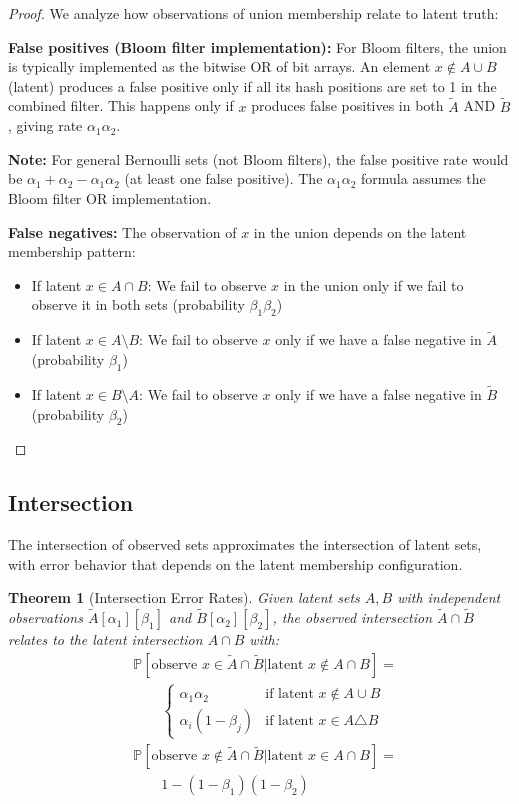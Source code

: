 \documentclass[11pt,final,hidelinks]{article}
\newtheorem{theorem}{Theorem}[section]
\newcommand{\obs}[1]{\widetilde{#1}}  %
\newcommand{\SetIntersection}{\cap}
\newcommand{\Prob}[1]{\mathbb{P}\left[#1\right]}
\newcommand{\fprate}{\alpha}
\newcommand{\fnrate}{\beta}
\begin{document}
\begin{proof}
We analyze how observations of union membership relate to latent truth:

\textbf{False positives (Bloom filter implementation):} For Bloom filters, the union is typically implemented as the bitwise OR of bit arrays. An element $x \notin A \cup B$ (latent) produces a false positive only if all its hash positions are set to 1 in the combined filter. This happens only if $x$ produces false positives in both $\obs{A}$ AND $\obs{B}$, giving rate $\fprate_1 \fprate_2$.

\textbf{Note:} For general Bernoulli sets (not Bloom filters), the false positive rate would be $\fprate_1 + \fprate_2 - \fprate_1\fprate_2$ (at least one false positive). The $\fprate_1 \fprate_2$ formula assumes the Bloom filter OR implementation.

\textbf{False negatives:} The observation of $x$ in the union depends on the latent membership pattern:
\begin{itemize}
    \item If latent $x \in A \cap B$: We fail to observe $x$ in the union only if we fail to observe it in both sets (probability $\fnrate_1 \fnrate_2$)
    \item If latent $x \in A \setminus B$: We fail to observe $x$ only if we have a false negative in $\obs{A}$ (probability $\fnrate_1$)
    \item If latent $x \in B \setminus A$: We fail to observe $x$ only if we have a false negative in $\obs{B}$ (probability $\fnrate_2$)
\end{itemize}
\end{proof}

\subsection{Intersection}

The intersection of observed sets approximates the intersection of latent sets, with error behavior that depends on the latent membership configuration.

\begin{theorem}[Intersection Error Rates]
Given latent sets $A, B$ with independent observations $\obs{A}[\fprate_1][\fnrate_1]$ and $\obs{B}[\fprate_2][\fnrate_2]$, the observed intersection $\obs{A} \SetIntersection \obs{B}$ relates to the latent intersection $A \SetIntersection B$ with:
\begin{align}
&\Prob{\text{observe } x \in \obs{A} \SetIntersection \obs{B} | \text{latent } x \notin A \SetIntersection B} = \\
&\qquad\begin{cases}
\fprate_1 \fprate_2 & \text{if latent } x \notin A \cup B \\
\fprate_i(1-\fnrate_j) & \text{if latent } x \in A \triangle B
\end{cases} \\
&\Prob{\text{observe } x \notin \obs{A} \SetIntersection \obs{B} | \text{latent } x \in A \SetIntersection B} = \\
&\qquad 1 - (1-\fnrate_1)(1-\fnrate_2)
\end{align}
\end{theorem}
\end{document}
